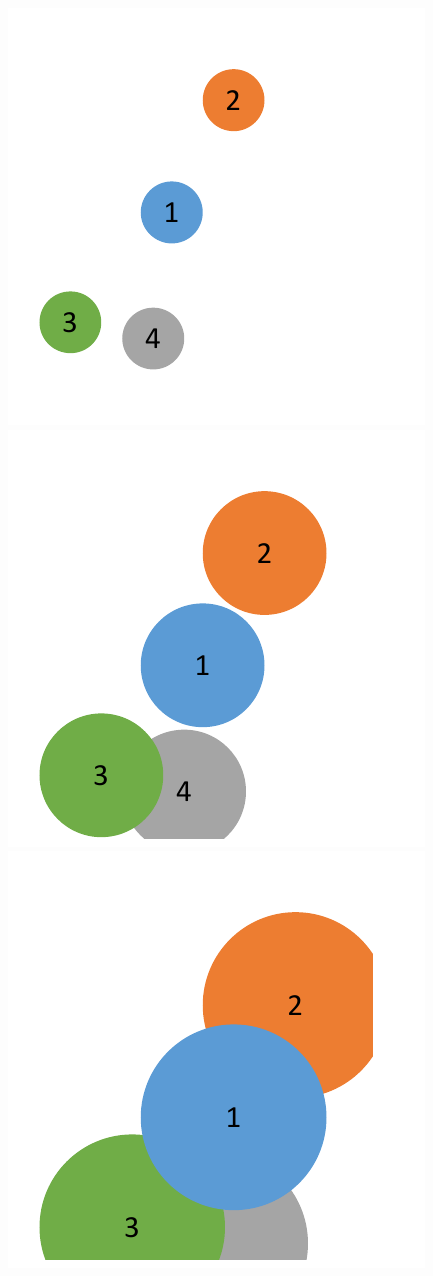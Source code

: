 \begin{figure}

\includegraphics[width=0.2\paperwidth]{figure/sv1}
\includegraphics[width=0.2\paperwidth]{figure/sv2}
\includegraphics[width=0.2\paperwidth]{figure/sv3}

\end{figure}
